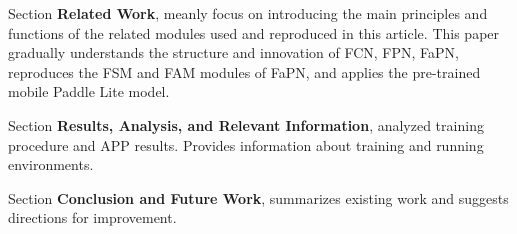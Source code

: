 Section \uppercase\expandafter{} \textbf{Related Work}, meanly focus on introducing the main principles and functions of the related modules used and reproduced in this article. This paper gradually understands the structure and innovation of FCN, FPN, FaPN, reproduces the FSM and FAM modules of FaPN, and applies the pre-trained mobile Paddle Lite model.


Section \uppercase\expandafter{} \textbf{Results, Analysis, and Relevant Information}, analyzed training procedure and APP results. Provides information about training and running environments.


Section \uppercase\expandafter{} \textbf{Conclusion and Future Work}, summarizes existing work and suggests directions for improvement.
\clearpage